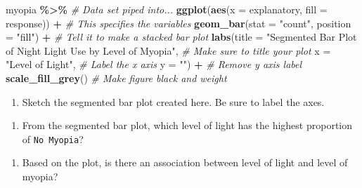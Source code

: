 \documentclass[
]{report}
\newenvironment{Shaded}{\begin{snugshade}}{\end{snugshade}}
\newcommand{\AttributeTok}[1]{\textcolor[rgb]{0.13,0.29,0.53}{#1}}
\newcommand{\CommentTok}[1]{\textcolor[rgb]{0.56,0.35,0.01}{\textit{#1}}}
\newcommand{\FunctionTok}[1]{\textcolor[rgb]{0.13,0.29,0.53}{\textbf{#1}}}
\newcommand{\NormalTok}[1]{#1}
\newcommand{\SpecialCharTok}[1]{\textcolor[rgb]{0.81,0.36,0.00}{\textbf{#1}}}
\newcommand{\StringTok}[1]{\textcolor[rgb]{0.31,0.60,0.02}{#1}}
\providecommand{\tightlist}{%
  \setlength{\itemsep}{0pt}\setlength{\parskip}{0pt}}
\begin{document}
\begin{Shaded}
\begin{Highlighting}[]
\NormalTok{myopia }\SpecialCharTok{\%\textgreater{}\%} \CommentTok{\# Data set piped into...}
\FunctionTok{ggplot}\NormalTok{(}\FunctionTok{aes}\NormalTok{(}\AttributeTok{x =}\NormalTok{ explanatory, }\AttributeTok{fill =}\NormalTok{ response)) }\SpecialCharTok{+}   \CommentTok{\# This specifies the variables}
  \FunctionTok{geom\_bar}\NormalTok{(}\AttributeTok{stat =} \StringTok{"count"}\NormalTok{, }\AttributeTok{position =} \StringTok{"fill"}\NormalTok{) }\SpecialCharTok{+}  \CommentTok{\# Tell it to make a stacked bar plot}
  \FunctionTok{labs}\NormalTok{(}\AttributeTok{title =} \StringTok{"Segmented Bar Plot of Night Light Use by Level of Myopia"}\NormalTok{,  }
       \CommentTok{\# Make sure to title your plot }
       \AttributeTok{x =} \StringTok{"Level of Light"}\NormalTok{,   }\CommentTok{\# Label the x axis}
       \AttributeTok{y =} \StringTok{""}\NormalTok{)  }\SpecialCharTok{+} \CommentTok{\# Remove y axis label}
  \FunctionTok{scale\_fill\_grey}\NormalTok{()  }\CommentTok{\# Make figure black and weight}
\end{Highlighting}
\end{Shaded}

\begin{enumerate}
\def\labelenumi{\arabic{enumi}.}
\setcounter{enumi}{8}
\tightlist
\item
  Sketch the segmented bar plot created here. Be sure to label the axes.
\end{enumerate}

\vspace{2in}

\begin{enumerate}
\def\labelenumi{\arabic{enumi}.}
\setcounter{enumi}{9}
\tightlist
\item
  From the segmented bar plot, which level of light has the highest proportion of \texttt{No\ Myopia}?
\end{enumerate}

\vspace{0.5in}

\begin{enumerate}
\def\labelenumi{\arabic{enumi}.}
\setcounter{enumi}{10}
\tightlist
\item
  Based on the plot, is there an association between level of light and level of myopia?
\end{enumerate}

\vspace{1in}
\end{document}
